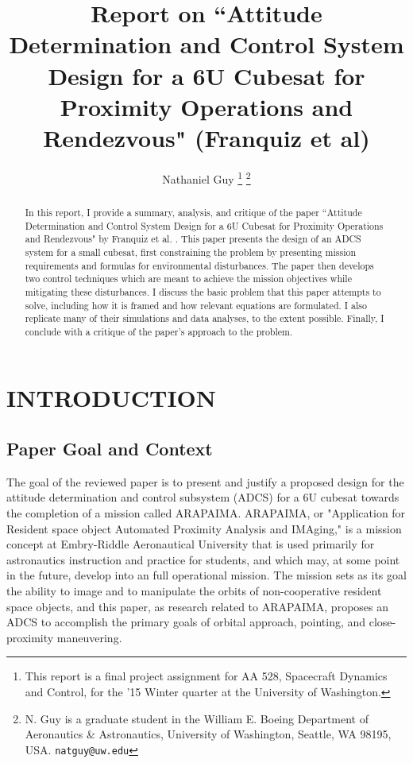 \documentclass[letterpaper, 11 pt, conference]{ieeeconf}  %
\title{\LARGE \bf
Report on ``Attitude Determination and Control System Design for a 6U Cubesat for Proximity Operations and Rendezvous" (Franquiz et al)
}
\author{Nathaniel Guy%
\thanks{This report is a final project assignment for AA 528, Spacecraft Dynamics and Control, for the '15 Winter quarter at the University of Washington.}
\thanks{N. Guy is a graduate student in the William E. Boeing Department of Aeronautics \& Astronautics, University of Washington, Seattle, WA 98195, USA.
        {\tt\small natguy@uw.edu}}%
}
\begin{document}
\maketitle
\thispagestyle{empty}
\pagestyle{empty}

\begin{abstract}

In this report, I provide a summary, analysis, and critique of the paper ``Attitude Determination and Control System Design for a 6U Cubesat for Proximity Operations and Rendezvous" by Franquiz et al. \cite{franquiz}. This paper presents the design of an ADCS system for a small cubesat, first constraining the problem by presenting mission requirements and formulas for environmental disturbances. The paper then develops two control techniques which are meant to achieve the mission objectives while mitigating these disturbances. I discuss the basic problem that this paper attempts to solve, including how it is framed and how relevant equations are formulated. I also replicate many of their simulations and data analyses, to the extent possible. Finally, I conclude with a critique of the paper's approach to the problem.

\end{abstract}


\section{INTRODUCTION}

\subsection{Paper Goal and Context}

The goal of the reviewed paper is to present and justify a proposed design for the attitude determination and control subsystem (ADCS) for a 6U cubesat towards the completion of a mission called ARAPAIMA. ARAPAIMA, or "Application for Resident space object Automated Proximity Analysis and IMAging," is a mission concept at Embry-Riddle Aeronautical University that is used primarily for astronautics instruction and practice for students, and which may, at some point in the future, develop into an full operational mission. The mission sets as its goal the ability to image and to manipulate the orbits of non-cooperative resident space objects, and this paper, as research related to ARAPAIMA, proposes an ADCS to accomplish the primary goals of orbital approach, pointing, and close-proximity maneuvering.
\end{document}
